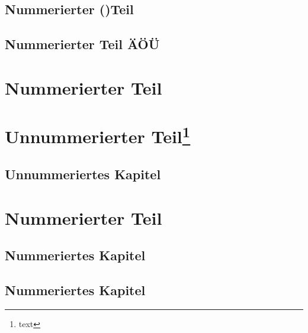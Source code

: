 \documentclass[ngerman,%
cd=full,%
a3paper,%
tudscrver=2.05,%
chapterprefix=true,
]{tudscrreprt}
\begin{document}



\chapter{Nummerierter ()Teil}

\chapter*{Nummerierter Teil ÄÖÜ}
\blindtext


\setcounter{secnumdepth}{-2}
\begingroup
{}
\part{Nummerierter Teil}
\endgroup
\setcounter{secnumdepth}{\subparagraphnumdepth}


\setpartpreamble{\blindtext}
\part*{Unnummerierter Teil\footnote{text}}
\setchapterpreamble{\blindtext}
\chapter*{Unnummeriertes Kapitel}
\setpartpreamble{\blindtext}
\setpartpreamble{\blindtext}

\part{Nummerierter Teil}
\setchapterpreamble{\blindtext}
\chapter{Nummeriertes Kapitel}
\setcounter{secnumdepth}{-2}
\begingroup
\setchapterpreamble{\blindtext}
\chapter{Nummeriertes Kapitel}
\endgroup
\setcounter{secnumdepth}{\subparagraphnumdepth}
\setchapterpreamble{\blindtext}
\end{document}
